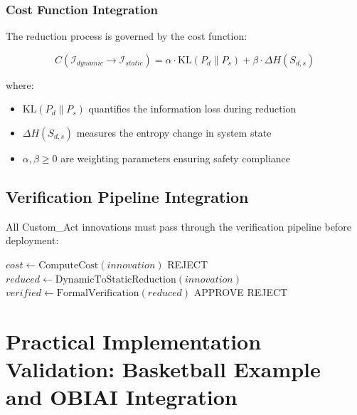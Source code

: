 \documentclass[12pt,a4paper]{article}
\begin{document}
\subsubsection{Cost Function Integration}

The reduction process is governed by the cost function:

\begin{equation}
C(\mathcal{I}_{dynamic} \rightarrow \mathcal{I}_{static}) = \alpha \cdot \text{KL}(P_d \| P_s) + \beta \cdot \Delta H(S_{d,s})
\end{equation}

where:
\begin{itemize}
    \item $\text{KL}(P_d \| P_s)$ quantifies the information loss during reduction
    \item $\Delta H(S_{d,s})$ measures the entropy change in system state
    \item $\alpha, \beta \geq 0$ are weighting parameters ensuring safety compliance
\end{itemize}

\subsection{Verification Pipeline Integration}

All Custom\_Act innovations must pass through the verification pipeline before deployment:

\begin{algorithm}
\caption{Custom\_Act Verification Pipeline}
\begin{algorithmic}[1]
    \State $cost \gets \text{ComputeCost}(innovation)$
        \State \Return \textsc{REJECT}
    \EndIf
    \State $reduced \gets \text{DynamicToStaticReduction}(innovation)$
    \State $verified \gets \text{FormalVerification}(reduced)$
        \State \Return \textsc{APPROVE}
    \Else
        \State \Return \textsc{REJECT}
    \EndIf
\EndFunction
\end{algorithmic}
\end{algorithm}

\clearpage

\section{Practical Implementation Validation: Basketball Example and OBIAI Integration}
\end{document}
